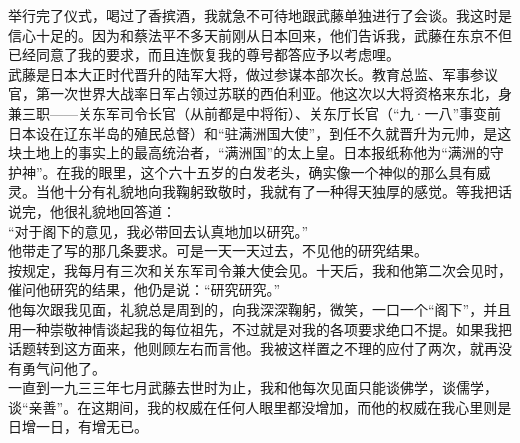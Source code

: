 举行完了仪式，喝过了香摈酒，我就急不可待地跟武藤单独进行了会谈。我这时是信心十足的。因为和蔡法平不多天前刚从日本回来，他们告诉我，武藤在东京不但已经同意了我的要求，而且连恢复我的尊号都答应予以考虑哩。\\

武藤是日本大正时代晋升的陆军大将，做过参谋本部次长。教育总监、军事参议官，第一次世界大战率日军占领过苏联的西伯利亚。他这次以大将资格来东北，身兼三职——关东军司令长官（从前都是中将衔）、关东厅长官（“九·一八”事变前日本设在辽东半岛的殖民总督）和“驻满洲国大使”，到任不久就晋升为元帅，是这块土地上的事实上的最高统治者，“满洲国”的太上皇。日本报纸称他为“满洲的守护神”。在我的眼里，这个六十五岁的白发老头，确实像一个神似的那么具有威灵。当他十分有礼貌地向我鞠躬致敬时，我就有了一种得天独厚的感觉。等我把话说完，他很礼貌地回答道：\\

“对于阁下的意见，我必带回去认真地加以研究。”\\

他带走了写的那几条要求。可是一天一天过去，不见他的研究结果。\\

按规定，我每月有三次和关东军司令兼大使会见。十天后，我和他第二次会见时，催问他研究的结果，他仍是说：“研究研究。”\\

他每次跟我见面，礼貌总是周到的，向我深深鞠躬，微笑，一口一个“阁下”，并且用一种崇敬神情谈起我的每位祖先，不过就是对我的各项要求绝口不提。如果我把话题转到这方面来，他则顾左右而言他。我被这样置之不理的应付了两次，就再没有勇气问他了。\\

一直到一九三三年七月武藤去世时为止，我和他每次见面只能谈佛学，谈儒学，谈“亲善”。在这期间，我的权威在任何人眼里都没增加，而他的权威在我心里则是日增一日，有增无已。
